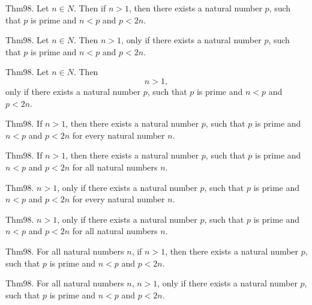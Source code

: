 \documentclass{article}
\begin{document}
Thm98. Let $n \in N$. Then if $n > 1$, then there exists a natural number $p$, such that $p$ is prime and $n < p$ and $p < 2 n$.

Thm98. Let $n \in N$. Then $n > 1$, only if there exists a natural number $p$, such that $p$ is prime and $n < p$ and $p < 2 n$.

Thm98. Let $n \in N$. Then $$n > 1,$$ only if there exists a natural number $p$, such that $p$ is prime and $n < p$ and $p < 2 n$.

Thm98. If $n > 1$, then there exists a natural number $p$, such that $p$ is prime and $n < p$ and $p < 2 n$ for every natural number $n$.

Thm98. If $n > 1$, then there exists a natural number $p$, such that $p$ is prime and $n < p$ and $p < 2 n$ for all natural numbers $n$.

Thm98. $n > 1$, only if there exists a natural number $p$, such that $p$ is prime and $n < p$ and $p < 2 n$ for every natural number $n$.

Thm98. $n > 1$, only if there exists a natural number $p$, such that $p$ is prime and $n < p$ and $p < 2 n$ for all natural numbers $n$.

Thm98. For all natural numbers $n$, if $n > 1$, then there exists a natural number $p$, such that $p$ is prime and $n < p$ and $p < 2 n$.

Thm98. For all natural numbers $n$, $n > 1$, only if there exists a natural number $p$, such that $p$ is prime and $n < p$ and $p < 2 n$.
\end{document}
